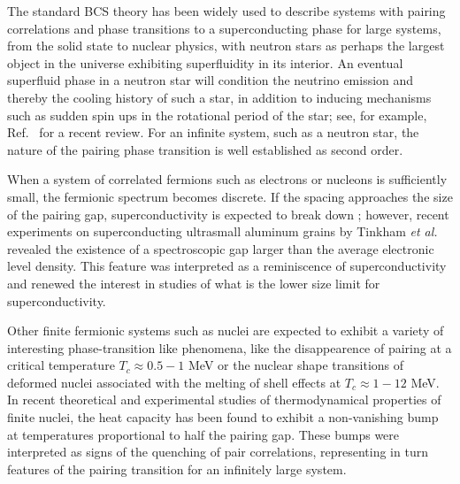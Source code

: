 \begin{multicols}{2}  
The standard BCS theory has been widely used to describe 
systems with pairing correlations and phase transitions to a
superconducting phase for large systems, 
from the solid state to nuclear physics,
with neutron stars as perhaps the largest object in the universe
exhibiting  superfluidity in its interior.  
An eventual superfluid phase in a neutron star will condition 
the neutrino emission and thereby the cooling history of such a
star, in addition to inducing mechanisms such as 
sudden spin ups in the rotational
period of the star; see, for example, Ref.~\cite{hh2000} for a recent review. 
For an infinite system, such as a neutron star, the nature
of the pairing phase transition is well established as second order.
 
When a system of correlated fermions such as electrons or
nucleons is sufficiently small,
the fermionic spectrum becomes
discrete. If the spacing approaches the size of the pairing gap,
superconductivity is expected to break down \cite{anderson59};
however, recent experiments on superconducting ultrasmall aluminum 
grains by Tinkham
{\em et al.} \cite{tinkham9598} revealed the existence of a
spectroscopic gap larger than the average electronic level density.
This feature was interpreted as a reminiscence of superconductivity
and renewed the interest \cite{delft98,mastellone98,sierra99,delft2000}
in studies  of what is the lower size limit for superconductivity.

Other finite fermionic systems such as   
nuclei are expected to
exhibit a variety of interesting phase-transition like phenomena, like
the disappearence of pairing at a critical temperature $T_c\approx
0.5-1$ MeV or the nuclear shape transitions of deformed nuclei
associated with the melting of shell effects at  
$T_c\approx 1-12$ MeV.  
In recent theoretical and experimental studies \cite{yoram2000,andreas2000}
of thermodynamical properties of finite nuclei, the heat capacity 
has been found to exhibit a non-vanishing bump at temperatures proportional to
half the pairing gap. These bumps were interpreted as  signs of the 
quenching of pair correlations, representing in turn features
of the pairing transition for an infinitely large system. 


\end{multicols}
